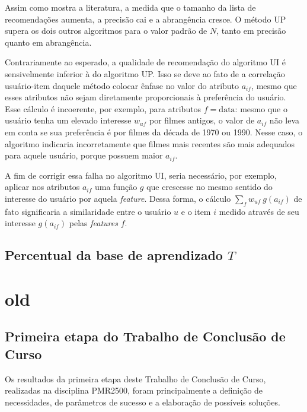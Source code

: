 Assim como mostra a literatura, a medida que o tamanho da lista de recomendações aumenta, a precisão cai e a abrangência cresce. O método UP supera os dois outros algoritmos para o valor padrão de $N$, tanto em precisão quanto em abrangência. 

Contrariamente ao esperado, a qualidade de recomendação do algoritmo UI é sensivelmente inferior à do algoritmo UP. Isso se deve ao fato de a correlação usuário-item daquele método colocar ênfase no valor do atributo $a_{if}$, mesmo que esses atributos não sejam diretamente proporcionais à preferência do usuário. Esse cálculo é incoerente, por exemplo, para atributos $f=\mathrm{data}$: mesmo que o usuário tenha um elevado interesse $w_{uf}$ por filmes antigos, o valor de $a_{if}$ não leva em conta se sua preferência é por filmes da década de 1970 ou 1990. Nesse caso, o algoritmo indicaria incorretamente que filmes mais recentes são mais adequados para aquele usuário, porque possuem maior $a_{if}$.

A fim de corrigir essa falha no algoritmo UI, seria necessário, por exemplo, aplicar nos atributos $a_{if}$ uma função $g$ que crescesse no mesmo sentido do interesse do usuário por aquela \textit{feature}. Dessa forma, o cálculo $\sum_f w_{uf}~g\left(a_{if}\right)$ de fato significaria a similaridade entre o usuário $u$ e o item $i$ medido através de seu interesse $g\left(a_{if}\right)$ pelas \textit{features} $f$.

\section{Percentual da base de aprendizado $T$} %
\label{sec:percentual_da_base_de_aprendizado_}


\chapter[old]{old}
\label{chap:old}

\section{Primeira etapa do Trabalho de Conclusão de Curso} %
\label{sec:primeira_etapa_do_trabalho_de_conclus_o_de_curso}

Os resultados da primeira etapa deste Trabalho de Conclusão de Curso, realizadas na disciplina PMR2500, foram principalmente a definição de necessidades, de parâmetros de sucesso e a elaboração de possíveis soluções. 

